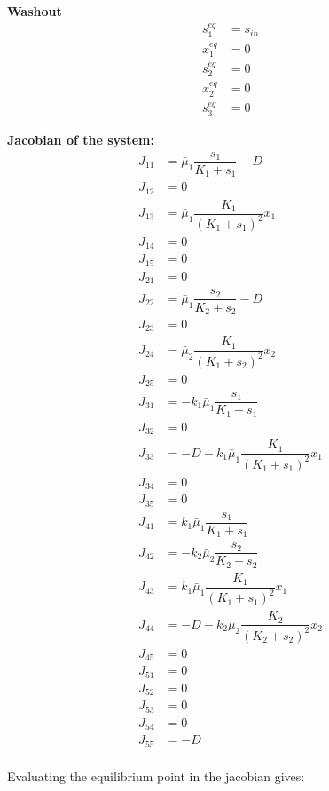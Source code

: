 \documentclass[]{report}
\begin{document}
\textbf{Washout}
\begin{align}
s_1^{eq} &= s_{in} \\
x_1^{eq} &= 0 \\
s_2^{eq} &= 0 \\
x_2^{eq} &=0 \\
s_3^{eq} &= 0 
\end{align}

\textbf{Jacobian of the system:}
\begin{align}
J_{11} & = \bar{\mu}_1 \dfrac{s_1}{K_1 + s_1} -D \\
J_{12} & = 0 \\
J_{13} & = \bar{\mu}_1 \dfrac{K_1}{(K_1 + s_1)^2}x_1 \\
J_{14} & = 0 \\
J_{15} & = 0 \\
J_{21} & = 0 \\
J_{22} & = \bar{\mu}_1 \dfrac{s_2}{K_2 + s_2} -D \\
J_{23} & = 0 \\
J_{24} & = \bar{\mu}_2 \dfrac{K_1}{(K_1 + s_2)^2}x_2  \\
J_{25} & = 0 \\
J_{31} & = -k_1\bar{\mu}_1 \dfrac{s_1}{K_1 + s_1} \\
J_{32} & = 0 \\
J_{33} & = -D -k_1\bar{\mu}_1 \dfrac{K_1}{(K_1 + s_1)^2}x_1 \\
J_{34} & = 0 \\
J_{35} & = 0 \\
J_{41} & = k_1\bar{\mu}_1 \dfrac{s_1}{K_1 + s_1} \\
J_{42} & = -k_2\bar{\mu}_2 \dfrac{s_2}{K_2 + s_2} \\
J_{43} & = k_1  \bar{\mu}_1 \dfrac{K_1}{(K_1 + s_1)^2}x_1 \\
J_{44} & = -D-k_2 \bar{\mu}_2 \dfrac{K_2}{(K_2 + s_2)^2}x_2 \\
J_{45} & = 0 \\
J_{51} & = 0 \\
J_{52} & = 0 \\
J_{53} & = 0 \\
J_{54} & = 0 \\
J_{55} & = -D \\
\end{align}


Evaluating the equilibrium point in the jacobian gives:
\end{document}
